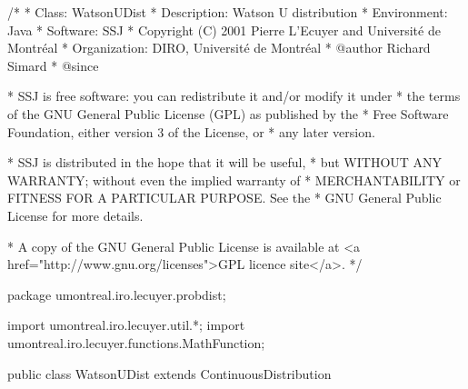 \begin{code}
\begin{hide}
/*
 * Class:        WatsonUDist
 * Description:  Watson U  distribution 
 * Environment:  Java
 * Software:     SSJ 
 * Copyright (C) 2001  Pierre L'Ecuyer and Université de Montréal
 * Organization: DIRO, Université de Montréal
 * @author       Richard Simard
 * @since

 * SSJ is free software: you can redistribute it and/or modify it under
 * the terms of the GNU General Public License (GPL) as published by the
 * Free Software Foundation, either version 3 of the License, or
 * any later version.

 * SSJ is distributed in the hope that it will be useful,
 * but WITHOUT ANY WARRANTY; without even the implied warranty of
 * MERCHANTABILITY or FITNESS FOR A PARTICULAR PURPOSE.  See the
 * GNU General Public License for more details.

 * A copy of the GNU General Public License is available at
   <a href="http://www.gnu.org/licenses">GPL licence site</a>.
 */
\end{hide}
package umontreal.iro.lecuyer.probdist;
\begin{hide}
import umontreal.iro.lecuyer.util.*;
import umontreal.iro.lecuyer.functions.MathFunction;
\end{hide} 

public class WatsonUDist extends ContinuousDistribution\begin{hide} {
   private static final double XSEPARE = 0.15;
   private static final double PI = Math.PI;
   private static final int JMAX = 10;
   protected int n;

   private static class Function implements MathFunction {
      protected int n;
      protected double u;

      public Function (int n, double u) {
         this.n = n;
         this.u = u;
      }

      public double evaluate (double x) {
         return u - cdf(n,x);
      }
   }

   private static double cdfn (int n, double x) {
      // The 1/n correction for the cdf, for x < XSEPARE
      double terme;
      double v = Math.exp (-0.125/x);
      double somme = 0;
      int j = 0;

      do {
         double a = (2*j + 1)*(2*j + 1);
         terme = Math.pow (v, (double)(2*j + 1)*(2*j + 1));
         double der = terme*(a - 4.0*x)/(8.0*x*x);
         somme += (5.0*x - 1.0/12.0) * der / 12.0;
         der = terme* (a*a - 24.0*a*x + 48.0*x*x)/ (64.0*x*x*x*x);
         somme += x*x*der/6.0;
         ++j;
      } while (!(terme <= Math.abs(somme) * Num.DBL_EPSILON || j > JMAX));
      if (j > JMAX)
         System.err.println (x + ": watsonU:  somme 1/n has not converged");

      v = -2.0*somme/(n*Math.sqrt (2.0*PI*x));
      return v;
   }\end{hide}
\end{code}
